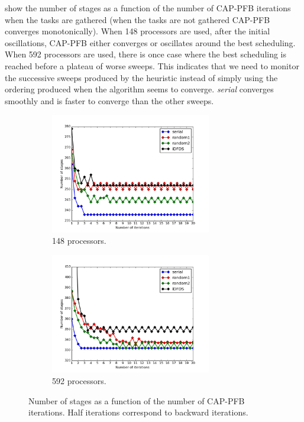 \documentclass[letterpaper]{article}
\renewcommand{\(}{\left(}
\renewcommand{\)}{\right)}
\renewcommand{\[}{\left[}
\renewcommand{\]}{\right]}
\begin{document}
 show the number of stages
as a function of the number of CAP-PFB iterations when the tasks are gathered (when the
tasks are not gathered CAP-PFB converges monotonically). When 148 processors are
used, after the initial oscillations, CAP-PFB either converges or oscillates
around the best scheduling. When 592 processors are used, there is once case
where the best scheduling is reached before a plateau of worse sweeps. This
indicates that we need to monitor the successive sweeps produced by the
heuristic instead of simply using the ordering produced when the algorithm seems
to converge. \emph{serial} converges smoothly and is faster to converge than the
other sweeps.
\begin{figure}[H]
  \begin{subfigure}[b]{.5\textwidth}
    \centering
    \includegraphics[width=7cm]{convergence_central_148}
    \caption{148 processors.}
  \label{convergence_central_148}
  \end{subfigure}
  \begin{subfigure}[b]{.5\textwidth}
    \centering
    \includegraphics[width=7cm]{convergence_central_592}
    \caption{592 processors.}
  \label{convergence_central_592}
  \end{subfigure}
  \caption{Number of stages as a function of the number of CAP-PFB iterations.
  Half iterations correspond to backward iterations.}
\end{figure}
\end{document}
